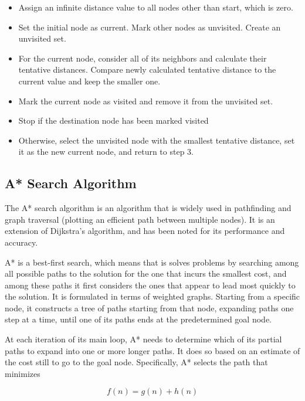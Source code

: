 \begin{itemize}
	\item Assign an infinite distance value to all nodes other than start, which is zero.
	\item Set the initial node as current. Mark other nodes as unvisited. Create an unvisited set.
	\item For the current node, consider all of its neighbors and calculate their tentative distances. Compare newly calculated tentative distance to the current value and keep the smaller one. 
	\item Mark the current node as visited and remove it from the unvisited set. 
	\item Stop if the destination node has been marked visited
	\item Otherwise, select the unvisited node with the smallest tentative distance, set it as the new current node, and return to step 3.
\end{itemize}


\subsection{A* Search Algorithm}

The A* search algorithm is an algorithm that is widely used in pathfinding and graph traversal (plotting an efficient path between multiple nodes). It is an extension of Dijkstra's algorithm, and has been noted for its performance and accuracy.

A* is a best-first search, which means that is solves problems by searching among all possible paths to the solution for the one that incurs the smallest cost, and among these paths it first considers the ones that appear to lead most quickly to the solution. It is formulated in terms of weighted graphs. Starting from a specific node, it constructs a tree of paths starting from that node, expanding paths one step at a time, until one of its paths ends at the predetermined goal node. 

At each iteration of its main loop, A* needs to determine which of its partial paths to expand into one or more longer paths. It does so based on an estimate of the cost still to go to the goal node. Specifically, A* selects the path that minimizes

\begin{equation}
	f(n) = g(n) + h(n)
\end{equation}

